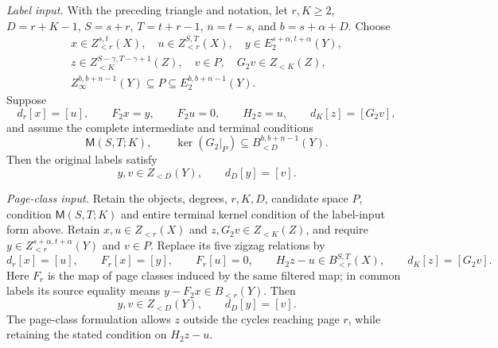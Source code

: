 \begin{corollary}
\label{sem:ProofTools:coverage-finite-zigzag-transport}

\textit{Label input.}
With the preceding triangle and notation, let $r,K\ge2$, $D=r+K-1$,
$S=s+r$, $T=t+r-1$, $n=t-s$, and $b=s+\alpha+D$.
Choose
\[
\begin{gathered}
x\in Z_{<r}^{s,t}(X),\quad u\in Z_{<r}^{S,T}(X),
\quad y\in E_2^{s+\alpha,t+\alpha}(Y),\\
z\in Z_{<K}^{S-\gamma,T-\gamma+1}(Z),\quad
v\in P,\quad G_2v\in Z_{<K}(Z),\\
Z_\infty^{b,b+n-1}(Y)\subseteq P\subseteq E_2^{b,b+n-1}(Y).
\end{gathered}
\]
Suppose
\[
d_r[x]=[u],\qquad F_2x=y,\qquad F_2u=0,\qquad
H_2z=u,\qquad d_K[z]=[G_2v],
\]
and assume the complete intermediate and terminal conditions
\[
\mathsf M(S,T;K),\qquad
\ker(G_2|_P)\subseteq B_{<D}^{b,b+n-1}(Y).
\]
Then the original labels satisfy
\[
y,v\in Z_{<D}(Y),\qquad d_D[y]=[v].
\]

\textit{Page-class input.}
Retain the objects, degrees, $r,K,D$, candidate space $P$, condition
$\mathsf M(S,T;K)$ and entire terminal kernel condition of
the label-input form above.
Retain $x,u\in Z_{<r}(X)$ and $z,G_2v\in Z_{<K}(Z)$, and require
$y\in Z_{<r}^{s+\alpha,t+\alpha}(Y)$ and $v\in P$.
Replace its five zigzag relations by
\[
d_r[x]=[u],\qquad F_r[x]=[y],\qquad F_r[u]=0,
\qquad H_2z-u\in B_{<r}^{S,T}(X),\qquad d_K[z]=[G_2v].
\]
Here $F_r$ is the map of page classes induced by the same filtered map;
in common labels its source equality means $y-F_2x\in B_{<r}(Y)$.
Then
\[
y,v\in Z_{<D}(Y),\qquad d_D[y]=[v].
\]
The page-class formulation allows $z$ outside the cycles reaching
page $r$, while retaining the stated condition on $H_2z-u$.


\end{corollary}
